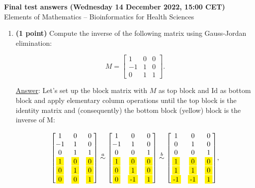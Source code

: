 \documentclass[]{book}
\theoremstyle{definition}
\newcommand\yellow[1]{\colorbox{yellow}{#1}}
\newcommand\ans{\underline{Answer}: }
\begin{document}
\begin{center}
\textbf{Final test answers (Wednesday 14 December 2022, 15:00 CET)}\\ %
Elements of Mathematics -- Bioinformatics for Health Sciences \\
\end{center}

\vspace{0.2 cm}

\begin{enumerate}



\item {\bf (1 point)} Compute the inverse of the following matrix using Gauss-Jordan elimination:

\[
   M=
  \left[ {\begin{array}{ccc}
  1 & 0 & 0 \\
  -1 & 1 & 0 \\
  0 & 1 & 1
  \end{array} } \right].
\]

\ans Let's set up the block matrix with $M$ as top block and $\textrm{Id}$ as bottom block and apply elementary column operations until the top block is the identity matrix and (consequently) the bottom block (yellow) block is the inverse of M:

\[
{\begin{bmatrix}
1 & 0 & 0 \\
-1 & 1 & 0 \\ 
 0 & 1 & 1 \\
\yellow{1} & \yellow{0} & \yellow{0} \\
\yellow{0} &\yellow{1} &\yellow{0}  \\
\yellow{0}  & \yellow{0} & \yellow{1} 
  \end{bmatrix}
}
\stackrel{a}{\sim}
{\begin{bmatrix}
1 & 0 & 0   \\
-1 & 1 & 0   \\
 0 & 0 & 1 \\ 
\yellow{1} & \yellow{0} & \yellow{0} \\
\yellow{0} &\yellow{1} &\yellow{0} \\
\yellow{0}  & \yellow{-1} & \yellow{1} 
  \end{bmatrix}
}
\stackrel{b}{\sim}
{\begin{bmatrix}
1 & 0 & 0 \\
 0 & 1 & 0 \\
 0 & 0 & 1 \\
\yellow{1} & \yellow{0} & \yellow{0} \\
\yellow{1} &\yellow{1} &\yellow{0} \\
\yellow{-1}  & \yellow{-1} & \yellow{1} 
\end{bmatrix}},
\]


\end{enumerate}
\end{document}

